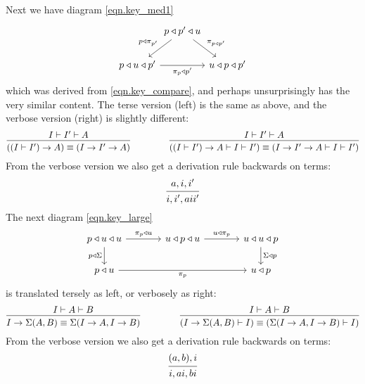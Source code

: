 \documentclass[11pt, one side, article]{memoir}
\theoremstyle{definition}
\theoremstyle{plain}
\newcommand{\0}{\textsf{0}}
\newcommand{\1}{\tn{\textsf{1}}}
\newcommand{\tri}{\mathbin{\triangleleft}}
\newcommand{\switch}{\pi}
\begin{document}
Next we have diagram \eqref{eqn.key_med1} 
\[
\begin{tikzcd}[column sep=0pt, ampersand replacement=\&]
	\&p\tri p'\tri u\ar[dl, "p\tri\switch_{p'}"']\ar[dr,"\switch_{p\tri p'}"]\\
	p\tri u\tri p'\ar[rr, "\switch_{p}\tri p'"']\&\&u\tri p\tri p'
\end{tikzcd}
\]
which was derived from \cref{eqn.key_compare}, and perhaps unsurprisingly has the very similar content. The terse version (left) is the same as above, and the verbose version (right) is slightly different:
\[
  \begin{prooftree}
    \Hypo{I\vdash I'\vdash A}
    \Infer1{((I\vdash I')\to A)\equiv (I\to I'\to A)}
  \end{prooftree}
\hspace{.6in}
  \begin{prooftree}
    \Hypo{I\vdash I'\vdash A}
    \Infer1{((I\vdash I')\to A\vdash I\vdash I')\equiv (I\to I'\to A\vdash I\vdash I')}
  \end{prooftree}
\]
From the verbose version we also get a derivation rule backwards on terms:
\[
  \begin{prooftree}
    \Hypo{a,i,i'}
    \Infer1{i,i',a i i'}
  \end{prooftree}
\]
The next diagram \eqref{eqn.key_large}
\[
\begin{tikzcd}[ampersand replacement=\&, column sep=large]
  p\tri u\tri u\ar[d, "p\tri\Sigma"']\ar[r, "\switch_p\tri u"]\&
  u\tri p\tri u\ar[r, "u\tri\switch_p"]\&
  u\tri u\tri p\ar[d, "\Sigma\tri p"]\\
  p\tri u\ar[rr, "\switch_p"']\&\&
  u\tri p
\end{tikzcd}
\]
is translated tersely as left, or verbosely as right:
\[
  \begin{prooftree}
    \Hypo{I\vdash A\vdash B}
    \Infer1{I\to\Sigma(A,B)\equiv\Sigma(I\to A,I\to B)}
  \end{prooftree}
  \hspace{.6in}
  \begin{prooftree}
    \Hypo{I\vdash A\vdash B}
    \Infer1{(I\to\Sigma(A,B)\vdash I)\equiv(\Sigma(I\to A,I\to B)\vdash I)}
  \end{prooftree}  
\]
From the verbose version we also get a derivation rule backwards on terms:
\[
  \begin{prooftree}
    \Hypo{(a,b),i}
    \Infer1{i,ai,bi}
  \end{prooftree}
\]
\end{document}
